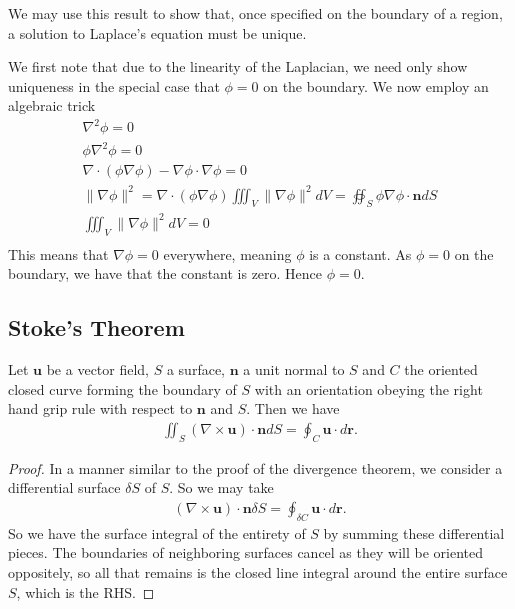 \documentclass[]{article}
\begin{document}
We may use this result to show that, once specified on the boundary of a region, a solution to Laplace's equation must be unique. 

We first note that due to the linearity of the Laplacian, we need only show uniqueness in the special case that $\phi = 0$ on the boundary. We now employ an algebraic trick
\begin{align*}
		\nabla^2 \phi = 0 \\
		\phi \nabla^2 \phi = 0 \\
		\nabla \cdot (\phi \nabla \phi) - \nabla \phi \cdot \nabla \phi = 0 \\
		\|\nabla \phi\|^2 = \nabla \cdot (\phi \nabla \phi)
		\iiint_V \|\nabla\phi\|^2 dV = \oiint_S \phi \nabla \phi \cdot \mathbf{n} dS \\
		\iiint_V \|\nabla\phi\|^2 dV = 0 \\
\end{align*}	
This means that $\nabla \phi = 0$ everywhere, meaning $\phi$ is a constant. As $\phi =  0$ on the boundary, we have that the constant is zero. Hence $\phi = 0$.

\subsection{Stoke's Theorem}

\begin{thm} 
		Let $\mathbf{u}$ be a vector field, $S$ a surface, $\mathbf{n}$ a unit normal to $S$ and $C$ the oriented closed curve forming the boundary of $S$ with an orientation obeying the right hand grip rule with respect to $\mathbf{n}$ and $S$. Then we have
		\begin{align*}
				\iint_S (\nabla \times \mathbf{u}) \cdot \mathbf{n} dS = \oint_C \mathbf{u} \cdot d\mathbf{r}.
		\end{align*}
\end{thm}

\begin{proof}
		In a manner similar to the proof of the divergence theorem, we consider a differential surface $\delta S$ of $S$. So we may take
		\begin{align*}
				(\nabla \times \mathbf{u}) \cdot \mathbf{n} \delta S = \oint_{\delta C} \mathbf{u} \cdot d\mathbf{r}.
		\end{align*}
		So we have the surface integral of the entirety of $S$ by summing these differential pieces. The boundaries of neighboring surfaces cancel as they will be oriented oppositely, so all that remains is the closed line integral around the entire surface $S$, which is the RHS.
\end{proof}
\end{document}
